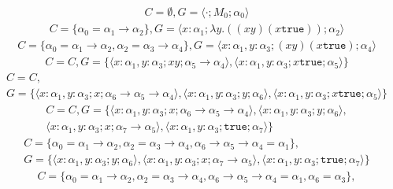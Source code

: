 \documentclass[11pt]{article}
\newcommand{\T}{\texttt{true}}
\newcommand{\rarr}{\rightarrow}
\begin{document}
\begin{enumerate}
	      \begin{align}
		      C = \emptyset, G = { \langle \cdot ; M_0 ; \alpha_0 \rangle }
	      \end{align}
	      \begin{align}
		      C = \{ \alpha_0 = \alpha_1 \rarr \alpha_2 \}, G = { \langle x: \alpha_1; \lambda y. ((xy)(x \texttt{true})); \alpha_2 \rangle  }
	      \end{align}
	      \begin{align}
		      C = \{ \alpha_0 = \alpha_1 \rarr \alpha_2, \alpha_2 = \alpha_3 \rarr \alpha_4 \}, G = { \langle x: \alpha_1, y: \alpha_3 ; (xy)(x \T); \alpha_4 \rangle  }
	      \end{align}
	      \begin{multline}
		      C = C, G = \{ \langle x: \alpha_1, y: \alpha_3 ; xy ; \alpha_5 \rarr \alpha_4 \rangle, \langle x: \alpha_1, y:\alpha_3 ; x\T; \alpha_5 \rangle   \}
	      \end{multline}
	      \begin{multline}
		      C = C, \\
		      G = \{ \langle x: \alpha_1, y:\alpha_3 ; x ; \alpha_6 \rarr \alpha_5\rarr \alpha_4  \rangle , \langle x: \alpha_1, y:\alpha_3 ; y ; \alpha_6  \rangle , \langle x: \alpha_1, y:\alpha_3 ; x\T; \alpha_5  \rangle  \} 
	      \end{multline}
	      \begin{multline}
		      C = C, G = \{ \langle x: \alpha_1, y:\alpha_3 ; x ; \alpha_6 \rarr \alpha_5\rarr \alpha_4  \rangle , \langle x: \alpha_1, y:\alpha_3 ; y ; \alpha_6 \rangle,\\ \langle  x: \alpha_1, y:\alpha_3 ; x ; \alpha_7 \rarr \alpha_5  \rangle, \langle x: \alpha_1, y:\alpha_3 ; \T ; \alpha_7 \rangle \}                                                      
	      \end{multline}
	      \begin{multline}
		      C = \{ \alpha_0 = \alpha_1 \rarr \alpha_2, \alpha_2 = \alpha_3 \rarr \alpha_4, \alpha_6 \rarr \alpha_5 \rarr \alpha_4 = \alpha_1 \},   \\ 
		      G = \{ \langle x: \alpha_1, y:\alpha_3 ; y ; \alpha_6 \rangle, \langle  x: \alpha_1, y:\alpha_3 ; x ; \alpha_7 \rarr \alpha_5  \rangle, \langle x: \alpha_1, y:\alpha_3 ; \T ; \alpha_7 \rangle \}  
	      \end{multline}
	      \begin{multline}
		      C = \{  \alpha_0 = \alpha_1 \rarr \alpha_2, \alpha_2 = \alpha_3 \rarr \alpha_4, \alpha_6 \rarr \alpha_5 \rarr \alpha_4 = \alpha_1, \alpha_6 = \alpha_3 \},                                                                  \\ 

\end{multline}
\end{enumerate}
\end{document}

